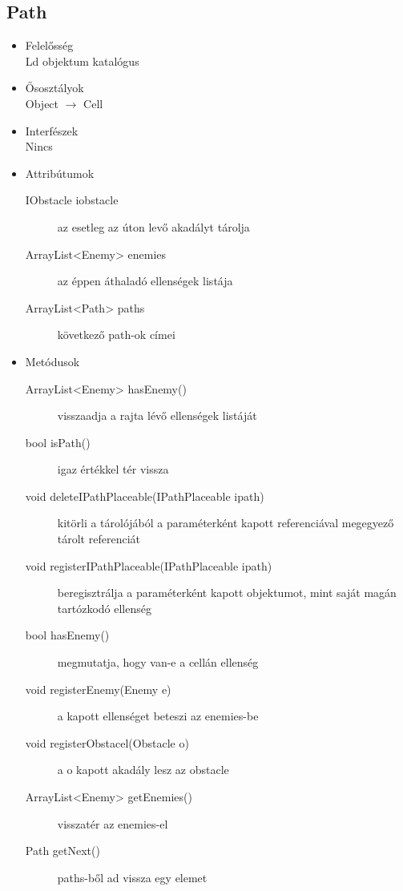 \subsection{Path}
\begin{itemize}
\item Felelősség\\
Ld objektum katalógus
\item Ősosztályok\\
Object $\rightarrow$ Cell
\item Interfészek\\
Nincs
\item Attribútumok\\
	\begin{description}
		\item[IObstacle iobstacle] az esetleg az úton levő akadályt tárolja
		\item[ArrayList<Enemy> enemies] az éppen áthaladó ellenségek listája
		\item[ArrayList<Path> paths] következő path-ok címei

		
	\end{description}
\item Metódusok\\
	\begin{description}
		\item[ArrayList<Enemy> hasEnemy()] visszaadja a rajta lévő ellenségek listáját
		\item[bool isPath()] igaz értékkel tér vissza
		\item[void deleteIPathPlaceable(IPathPlaceable ipath)] kitörli a tárolójából a paraméterként kapott referenciával megegyező tárolt referenciát
		\item[void registerIPathPlaceable(IPathPlaceable ipath)] beregisztrálja a paraméterként kapott objektumot, mint saját magán tartózkodó ellenség
		\item[bool hasEnemy()] megmutatja, hogy van-e a cellán ellenség
		\item[void registerEnemy(Enemy e)] a kapott ellenséget beteszi az enemies-be
		\item[void registerObstacel(Obstacle o)] a o kapott akadály lesz az obstacle
		\item[ArrayList<Enemy> getEnemies()] visszatér az enemies-el
		\item[Path getNext()] paths-ből ad vissza egy elemet
		
		
	\end{description}
\end{itemize}

